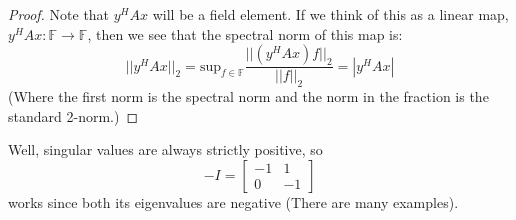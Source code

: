 \documentclass[12pt]{amsart}
\newenvironment{problem}[2][Problem]{\begin{trivlist}
\item[\hskip \labelsep {\bfseries #1}\hskip \labelsep {\bfseries #2.}]}{\end{trivlist}}
\begin{document}
\begin{problem}{4.33}
\begin{proof}
Note that $y^HAx$ will be a field element. If we think of this as a linear map, $y^HAx: \mathbb{F} \to \mathbb{F}$, then we see that the spectral norm of this map is:
$$||y^HAx||_2 = \text{sup}_{f \in \mathbb{F}} \frac{||(y^HAx)f||_2}{||f||_2} = |y^HAx| $$ (Where the first norm is the spectral norm and the norm in the fraction is the standard 2-norm.)
\end{proof}
\end{problem}

\begin{problem}{36}
Well, singular values are always strictly positive, so
$$
-I = \begin{bmatrix}
-1 & 1 \\
0 & -1
\end{bmatrix}
$$
works since both its eigenvalues are negative (There are many examples).
\end{problem}
\end{document}
